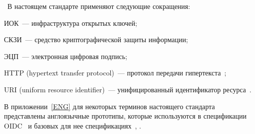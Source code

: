 
\thesection~В настоящем стандарте применяют следующие сокращения:

ИОК~--- инфраструктура открытых ключей;

СКЗИ~--- средство криптографической защиты информации;

ЭЦП~--- электронная цифровая подпись;

HTTP (hypertext transfer protocol)~--- протокол передачи 
гипертекста~\cite{RFC3986};

URI (uniform resource identifier)~--- унифицированный идентификатор 
ресурса~\cite{RFC3986}.

В приложении~\ref{ENG} для некоторых терминов настоящего стандарта представлены
англоязычные прототипы, которые используются в спецификации OIDC~\cite{OIDC} и
базовых для нее спецификациях~\cite{RFC6749}, \cite{RFC6750}.

